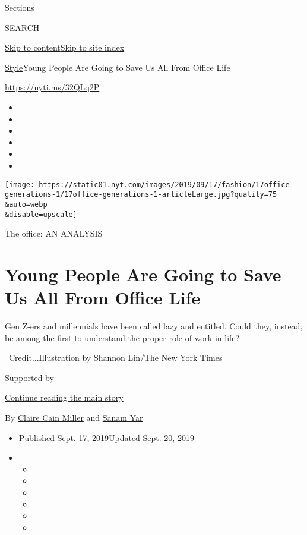 Sections

SEARCH

\protect\hyperlink{site-content}{Skip to
content}\protect\hyperlink{site-index}{Skip to site index}

\href{/section/style}{Style}\textbar{}Young People Are Going to Save Us
All From Office Life

\url{https://nyti.ms/32QLq2P}

\begin{itemize}
\item
\item
\item
\item
\item
\item
\end{itemize}

\texttt{[image: https://static01.nyt.com/images/2019/09/17/fashion/17office-generations-1/17office-generations-1-articleLarge.jpg?quality=75\\\&auto=webp\\\&disable=upscale]}

The office: AN ANALYSIS

\hypertarget{young-people-are-going-to-save-us-all-from-office-life}{%
\section{Young People Are Going to Save Us All From Office
Life}\label{young-people-are-going-to-save-us-all-from-office-life}}

Gen Z-ers and millennials have been called lazy and entitled. Could
they, instead, be among the first to understand the proper role of work
in life?

~Credit...Illustration by Shannon Lin/The New York Times

Supported by

\protect\hyperlink{after-sponsor}{Continue reading the main story}

By \href{https://www.nytimes.com/by/claire-cain-miller}{Claire Cain
Miller} and \href{https://www.nytimes.com/by/sanam-yar}{Sanam Yar}

\begin{itemize}
\item
  Published Sept. 17, 2019Updated Sept. 20, 2019
\item
  \begin{itemize}
  \item
  \item
  \item
  \item
  \item
  \item
  \end{itemize}
\end{itemize}


